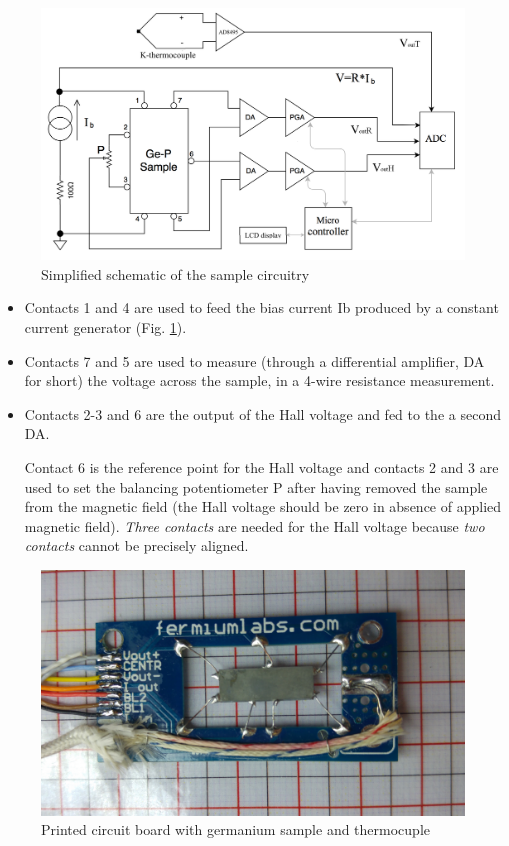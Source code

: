 \documentclass[]{book}
\begin{document}
\begin{figure}

{\centering \includegraphics[width=0.65\linewidth]{Assets/Figures/sample_circuitry} 

}

\caption{Simplified schematic of the sample circuitry}\label{fig:sample-circuitry}
\end{figure}

\begin{itemize}
\item
  Contacts 1 and 4 are used to feed the bias current Ib produced by a
  constant current generator (Fig. \ref{fig:sample-circuitry}).
\item
  Contacts 7 and 5 are used to measure (through a differential
  amplifier, DA for short) the voltage across the sample, in a 4-wire
  resistance measurement.
\item
  Contacts 2-3 and 6 are the output of the Hall voltage and fed to the a
  second DA.

  Contact 6 is the reference point for the Hall voltage and contacts 2
  and 3 are used to set the balancing potentiometer P after having
  removed the sample from the magnetic field (the Hall voltage should be
  zero in absence of applied magnetic field). \emph{Three contacts} are
  needed for the Hall voltage because \emph{two contacts} cannot be
  precisely aligned.
\end{itemize}

\begin{figure}

{\centering \includegraphics[width=0.65\linewidth]{Assets/Figures/sample_pcb} 

}

\caption{Printed circuit board with germanium sample and thermocuple}\label{fig:sample-pcb}
\end{figure}
\end{document}
